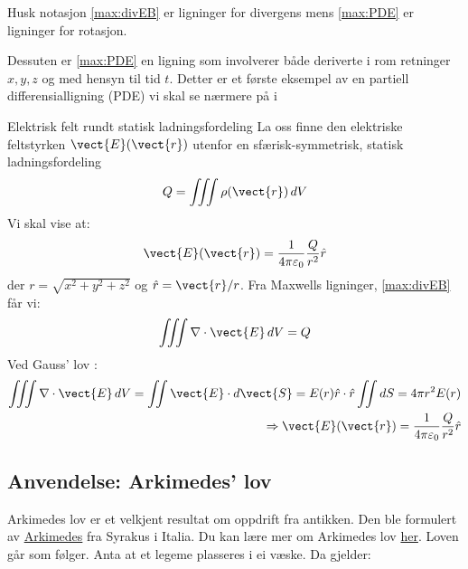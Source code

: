 \begin{rem}{}
Husk notasjon \eqref{max:divEB} er ligninger for divergens mens \eqref{max:PDE} er ligninger for rotasjon.

Dessuten er \eqref{max:PDE} en ligning som involverer både deriverte i rom retninger $x,y,z$ og med hensyn til tid $t$. Detter er et første eksempel av en partiell differensialligning (PDE) vi skal se nærmere på i 
\end{rem}
\begin{eks}{Elektrisk felt rundt statisk ladningsfordeling}
La oss finne den elektriske feltstyrken \( \vect{E}(\vect{r}) \) utenfor en sfærisk-symmetrisk, statisk ladningsfordeling 
\[
Q = \iiint \rho(\vect{r})\, dV
\]
Vi skal vise at:
\[
\vect{E}(\vect{r}) = \frac{1}{4 \pi \varepsilon_0} \frac{Q}{r^2} \hat{r}
\]
der \( r = \sqrt{x^2 + y^2 + z^2} \) og \( \hat{r} = \vect{r}/r \).
Fra Maxwells ligninger, \eqref{max:divEB} får vi:
\[
\iiint \nabla \cdot \vect{E}\, dV = Q
\]
Ved Gauss’ lov :
\begin{align*}
\iiint \nabla \cdot \vect{E}\, dV = \iint \vect{E} \cdot d\vect{S} = E(r) \hat{r} \cdot \hat{r} \iint dS = 4\pi r^2 E(r)
\\
\Rightarrow \vect{E}(\vect{r}) = \frac{1}{4 \pi \varepsilon_0} \frac{Q}{r^2} \hat{r}
\end{align*}
\end{eks}

%
\subsection{Anvendelse: Arkimedes' lov}
Arkimedes lov er et velkjent resultat om oppdrift fra antikken. Den ble formulert av \href{https://no.wikipedia.org/wiki/Arkimedes}{Arkimedes} fra Syrakus i Italia. Du kan lære mer om Arkimedes lov \href{https://www.youtube.com/watch?v=euvIlejovCA&list=PLBSPq-MdQqruVxoeYU6tAZ9t-kDUXXhoE&index=6}{her}. Loven går som følger. Anta at et legeme plasseres i ei væske. Da gjelder:

